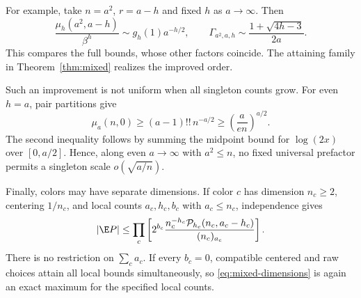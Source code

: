 For example, take $n=a^2$, $r=a-h$ and fixed $h$ as $a\to\infty$. Then
\[
\frac{\mu_h(a^2,a-h)}{\beta^h}
\sim g_h(1)a^{-h/2},
\qquad
\Gamma_{a^2,a,h}\sim\frac{1+\sqrt{4h-3}}{2a}.
\]
This compares the full bounds, whose other factors coincide. The attaining family in Theorem~\ref{thm:mixed} realizes the improved order.

Such an improvement is not uniform when all singleton counts grow. For even $h=a$, pair partitions give
\[
\mu_a(n,0)\ge(a-1)!!\,n^{-a/2}
\ge\left(\frac{a}{en}\right)^{a/2}.
\]
The second inequality follows by summing the midpoint bound for $\log(2x)$ over $[0,a/2]$. Hence, along even $a\to\infty$ with $a^2\le n$, no fixed universal prefactor permits a singleton scale $o(\sqrt{a/n})$.

Finally, colors may have separate dimensions. If color $c$ has dimension $n_c\ge2$, centering $1/n_c$, and local counts $a_c,h_c,b_c$ with $a_c\le n_c$, independence gives
\begin{equation}\label{eq:mixed-dimensions}
|\E P|\le\prod_c
\left[
2^{b_c}\frac{n_c^{-h_c}\mathcal P_{h_c}(n_c,a_c-h_c)}
{(n_c)_{a_c}}
\right].
\end{equation}
There is no restriction on $\sum_c a_c$. If every $b_c=0$, compatible centered and raw choices attain all local bounds simultaneously, so \eqref{eq:mixed-dimensions} is again an exact maximum for the specified local counts.
